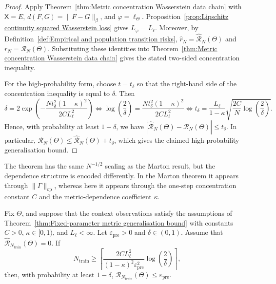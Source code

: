 \begin{proof}
Apply Theorem~\ref{thm:Metric concentration Wasserstein data chain} with \(\mathsf X=E\), \(d(F,G)=\|F-G\|_\beta\), and \(\varphi=\ell_\Theta\). Proposition~\ref{prop:Lipschitz continuity squared Wasserstein loss} gives \(L_\varphi=L_\ell\). Moreover, by Definition~\ref{def:Empirical and population transition risks}, \(\widehat r_N=\widehat{\mathcal R}_N(\Theta)\) and \(r_N=\mathcal R_N(\Theta)\). Substituting these identities into Theorem~\ref{thm:Metric concentration Wasserstein data chain} gives the stated two-sided concentration inequality.

For the high-probability form, choose \(t=t_\delta\) so that the right-hand side of the concentration inequality is equal to \(\delta\). Then
\[
\delta
=
2
\exp
\left(
-\frac{
Nt_\delta^2(1-\kappa)^2
}{
2CL_\ell^2
}
\right)
\Longleftrightarrow
\log\left(\frac2\delta\right)
=
\frac{
Nt_\delta^2(1-\kappa)^2
}{
2CL_\ell^2
}
\Longleftrightarrow
t_\delta
=
\frac{L_\ell}{1-\kappa}
\sqrt{
\frac{2C}{N}
\log\left(\frac2\delta\right)
}.
\]
Hence, with probability at least \(1-\delta\), we have \(|\widehat{\mathcal R}_N(\Theta)-\mathcal R_N(\Theta)|\leqslant t_\delta\). In particular, \(\mathcal R_N(\Theta)\leqslant\widehat{\mathcal R}_N(\Theta)+t_\delta\), which gives the claimed high-probability generalisation bound.
\end{proof}

The theorem has the same \(N^{-1/2}\) scaling as the Marton result, but the dependence structure is encoded differently. In the Marton theorem it appears through \(\|\Gamma\|_{\mathrm{op}}\), whereas here it appears through the one-step concentration constant \(C\) and the metric-dependence coefficient \(\kappa\).

\begin{proposition}
\label{prop:Metric pretraining sample complexity zero empirical risk}
Fix \(\Theta\), and suppose that the context observations satisfy the assumptions of Theorem~\ref{thm:Fixed-parameter metric generalisation bound} with constants \(C>0\), \(\kappa\in[0,1)\), and \(L_\ell<\infty\). Let \(\varepsilon_{\mathrm{pre}}>0\) and \(\delta\in(0,1)\). Assume that \(\widehat{\mathcal R}_{N_{\mathrm{train}}}(\Theta)=0\). If
\[
N_{\mathrm{train}}
\geq
\left\lceil
\frac{
2CL_\ell^2
}{
(1-\kappa)^2
\varepsilon_{\mathrm{pre}}^2
}
\log\left(\frac2\delta\right)
\right\rceil,
\]
then, with probability at least \(1-\delta\), \(\mathcal R_{N_{\mathrm{train}}}(\Theta)\leqslant\varepsilon_{\mathrm{pre}}\).
\end{proposition}


